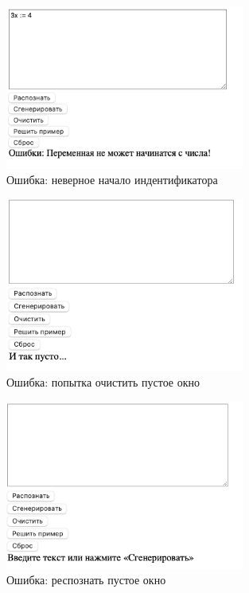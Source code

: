 \documentclass[areasetadvanced]{scrartcl}
\begin{document}
\begin{figure}[H]
    \centering
    \includegraphics[width=0.7\textwidth]{ErrorNotN.png}
    \caption{Ошибка: неверное начало индентификатора}
    \label{fig:syntdiag}
\end{figure}

\begin{figure}[H]
    \centering
    \includegraphics[width=0.7\textwidth]{Empty.png}
    \caption{Ошибка: попытка очистить пустое окно}
    \label{fig:syntdiag}
\end{figure}

\begin{figure}[H]
    \centering
    \includegraphics[width=0.7\textwidth]{FullEmpty.png}
    \caption{Ошибка: респознать пустое окно}
    \label{fig:syntdiag}
\end{figure}
\end{document}
